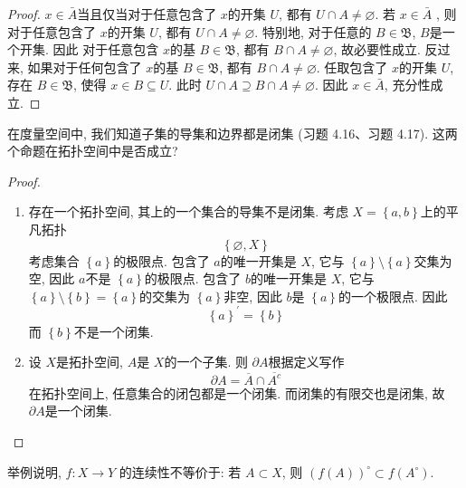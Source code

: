 \documentclass[../main.tex]{subfiles}
\begin{document}
\begin{proof}
    \(  x \in \bar{A}  \)当且仅当对于任意包含了 \(  x  \)的开集 \(  U  \), 都有 \(  U\cap A \neq  \varnothing  \). 若 \(  x \in \bar{A}  \) , 则对于任意包含了 \(  x  \)的开集 \(  U  \), 都有 \(  U\cap A \neq  \varnothing  \). 特别地, 对于任意的 \(  B\in \mathfrak{B}  \),   \(  B  \)是一个开集. 因此 对于任意包含 \(  x  \)的基 \(  B  \in \mathfrak{B}\), 都有 \(  B\cap A\neq \varnothing  \), 故必要性成立.  反过来, 如果对于任何包含了 \(  x  \)的基 \(  B\in \mathfrak{B}  \), 都有 \(  B\cap A\neq \varnothing  \). 任取包含了 \(  x  \)的开集 \(  U  \), 存在 \(  B \in \mathfrak{B}  \), 使得 \(  x \in B\subseteq U  \).        此时 \(  U\cap A\supseteq B\cap A\neq \varnothing  \). 因此 \(  x \in \bar{A}  \), 充分性成立.  
\end{proof}
\begin{exercise}{}{}
在度量空间中, 我们知道子集的导集和边界都是闭集 (习题 4.16、习题 4.17). 这两个命题在拓扑空间中是否成立?
\end{exercise}

\begin{proof}
   \begin{enumerate}
    \item  存在一个拓扑空间, 其上的一个集合的导集不是闭集. 考虑 \(  X= \left\{ a,b \right\}  \)上的平凡拓扑 \[
    \left\{ \varnothing,X \right\}
    \]考虑集合 \(  \left\{ a \right\}  \)的极限点. 包含了 \(  a  \)的唯一开集是 \(  X  \), 它与 \(  \left\{ a \right\}\setminus \left\{ a \right\}  \)交集为空, 因此 \(  a  \)不是 \(  \left\{ a \right\}  \)的极限点.  包含了 \(  b  \)的唯一开集是 \(  X  \), 它与 \(  \left\{ a \right\}\setminus \left\{ b \right\}= \left\{ a \right\}  \)的交集为 \(  \left\{ a \right\}  \)非空, 因此 \(  b  \)是 \(  \left\{ a \right\}  \)的一个极限点. 因此 \[
    \left\{ a \right\}^{\prime} = \left\{ b \right\}
    \]而 \(  \left\{ b \right\}  \)不是一个闭集. 
    \item   设 \(  X  \)是拓扑空间,  \(  A  \)是 \(  X  \)的一个子集.   则 \(   \partial A  \)根据定义写作 \[
     \partial A=  \overline{A}\cap  \overline{A^{c}}
    \] 在拓扑空间上, 任意集合的闭包都是一个闭集. 而闭集的有限交也是闭集, 故 \(   \partial A  \)是一个闭集. 
   \end{enumerate}
                 
  
\end{proof}

\begin{exercise}{}{}
举例说明, $f: X \to Y$ 的连续性不等价于: 若 $A \subset X$, 则 $(f(A))^\circ \subset f(A^\circ)$.
\end{exercise}
\end{document}

